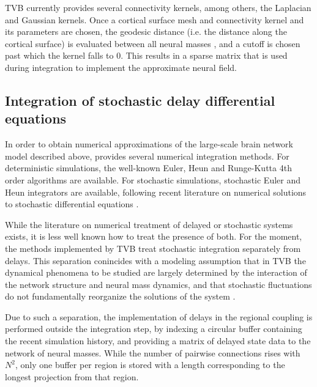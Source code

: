    TVB currently provides several connectivity kernels, among others, 
    the Laplacian and Gaussian kernels. Once a cortical surface mesh 
    and connectivity kernel and its parameters are chosen, the geodesic
    distance (i.e. the distance along the cortical surface) is evaluated
    between all neural masses \cite{Mitchell1987}, and a cutoff is chosen
    past which the kernel falls to 0. This results in a sparse matrix that 
    is used during integration to implement the approximate neural field. 

\subsection{Integration of stochastic delay differential equations}

    In order to obtain numerical approximations of the large-scale brain network model 
    described above, \TVB provides several numerical integration methods. For
    deterministic simulations, the well-known Euler, 
    Heun and Runge-Kutta 4th order 
    algorithms are available. For stochastic
    simulations, stochastic Euler and Heun integrators are available, 
    following recent literature on numerical solutions to stochastic
    differential equations \cite{Kloeden_1995,Mannella_2002,Mannella_1989}.

    While the literature on numerical treatment of delayed or 
    stochastic systems exists, it is less well known how to treat 
    the presence of both. For the moment, the methods implemented by TVB
    treat stochastic integration separately from delays. 
    This separation conincides with a modeling assumption that in
    TVB the dynamical phenomena to be studied are largely determined
    by the interaction of the network structure and neural mass dynamics, 
    and that stochastic fluctuations do not fundamentally reorganize the
    solutions of the system \cite{Ghosh_2008,Deco_2009,Deco_2011,Deco_Senden_2012}.

    Due to such a separation, the implementation of delays in the
    regional coupling is performed outside the integration step,
    by indexing a circular buffer containing the recent simulation 
    history, and providing a matrix of delayed state data to the 
    network of neural masses. While the number of pairwise
    connections rises with $N^2$, only one buffer per region 
    is stored with a length corresponding to the longest projection
    from that region.

